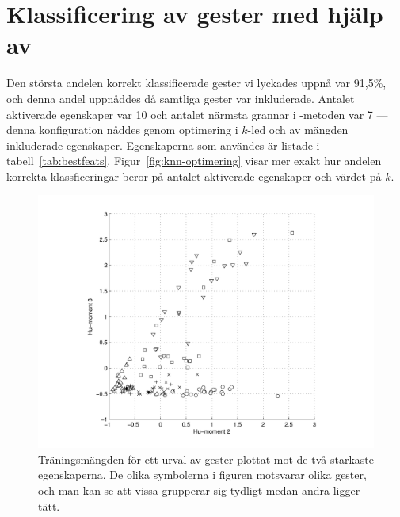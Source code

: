 \documentclass[../rapport_MVEX01-11-05]{subfiles}
\begin{document}
\section{Klassificering av gester med hjälp av \knn}
Den största andelen korrekt klassificerade gester vi lyckades uppnå var 91,5\%, och
denna andel uppnåddes då samtliga gester var inkluderade. Antalet aktiverade
egenskaper var 10 och antalet närmsta grannar i \knn-metoden var 7 --- denna
konfiguration nåddes genom optimering i $k$-led och av mängden inkluderade
egenskaper. Egenskaperna som
användes är listade i tabell~\ref{tab:bestfeats}.
Figur~\ref{fig:knn-optimering} visar mer exakt hur andelen korrekta
klassficeringar beror på antalet aktiverade egenskaper och värdet på $k$.

\begin{figure}[tbp]
  \centering
  \includegraphics[width=\textwidth,trim=2cm 0.5cm 2cm 0,clip=true]{bilder/feats-10+11}
  \caption{Träningsmängden för ett urval av gester plottat mot de två starkaste
  egenskaperna. De olika symbolerna i figuren motsvarar olika gester,
  och man kan se att vissa grupperar sig tydligt medan andra ligger tätt.}
  \label{fig:feats1011}
\end{figure}
\end{document}
